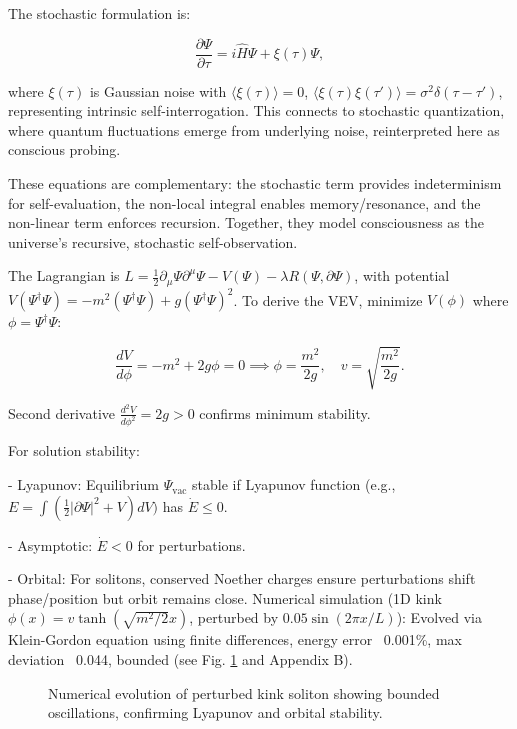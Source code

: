 \documentclass[12pt]{article}
\theoremstyle{definition}
\begin{document}
The stochastic formulation is:

\begin{equation}
\frac{\partial \Psi}{\partial \tau} = i \hat{H} \Psi + \xi(\tau) \Psi,
\label{eq:stochastic}
\end{equation}

where $\xi(\tau)$ is Gaussian noise with $\langle \xi(\tau) \rangle = 0$, $\langle \xi(\tau) \xi(\tau') \rangle = \sigma^2 \delta(\tau - \tau')$, representing intrinsic self-interrogation. This connects to stochastic quantization, where quantum fluctuations emerge from underlying noise, reinterpreted here as conscious probing.

These equations are complementary: the stochastic term provides indeterminism for self-evaluation, the non-local integral enables memory/resonance, and the non-linear term enforces recursion. Together, they model consciousness as the universe's recursive, stochastic self-observation.

The Lagrangian is $L = \frac{1}{2} \partial_\mu \Psi \partial^\mu \Psi - V(\Psi) - \lambda R(\Psi, \partial \Psi)$, with potential $V(\Psi^\dagger \Psi) = -m^2 (\Psi^\dagger \Psi) + g (\Psi^\dagger \Psi)^2$. To derive the VEV, minimize $V(\phi)$ where $\phi = \Psi^\dagger \Psi$:

\begin{equation}
\frac{dV}{d\phi} = -m^2 + 2g \phi = 0 \implies \phi = \frac{m^2}{2g}, \quad v = \sqrt{\frac{m^2}{2g}}.
\end{equation}

Second derivative $\frac{d^2 V}{d\phi^2} = 2g > 0$ confirms minimum stability.

For solution stability:

- Lyapunov: Equilibrium $\Psi_{\text{vac}}$ stable if Lyapunov function (e.g., $E = \int (\frac{1}{2} |\partial \Psi|^2 + V) dV )$ has $\dot{E} \leq 0$.

- Asymptotic: $\dot{E} < 0$ for perturbations.

- Orbital: For solitons, conserved Noether charges ensure perturbations shift phase/position but orbit remains close.
Numerical simulation (1D kink $\phi(x) = v \tanh(\sqrt{m^2/2} x)$, perturbed by $0.05 \sin(2\pi x/L)$): Evolved via Klein-Gordon equation using finite differences, energy error ~0.001\%, max deviation ~0.044, bounded (see Fig. \ref{fig:soliton_stability} and Appendix B).

\begin{figure}[htbp]
\centering
{}
\caption{Numerical evolution of perturbed kink soliton showing bounded oscillations, confirming Lyapunov and orbital stability.}
\label{fig:soliton_stability}
\end{figure}
\end{document}
